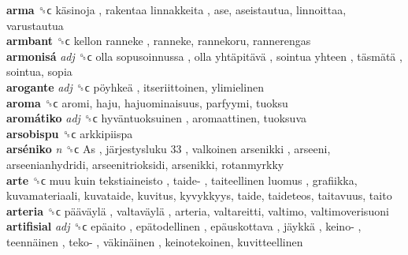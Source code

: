 \textbf{arma} ␝ϲ   käsinoja ,  rakentaa linnakkeita , ase, aseistautua, linnoittaa, varustautua  \\
\textbf{armbant} ␝ϲ   kellon ranneke , ranneke, rannekoru, rannerengas  \\
\textbf{armonisá} \emph{adj}  ␝ϲ   olla sopusoinnussa ,  olla yhtäpitävä ,  sointua yhteen ,  täsmätä , sointua, sopia  \\
\textbf{arogante} \emph{adj}  ␝ϲ   pöyhkeä , itseriittoinen, ylimielinen  \\
\textbf{aroma} ␝ϲ  aromi, haju, hajuominaisuus, parfyymi, tuoksu  \\
\textbf{aromátiko} \emph{adj}  ␝ϲ   hyväntuoksuinen , aromaattinen, tuoksuva  \\
\textbf{arsobispu} ␝ϲ  arkkipiispa  \\
\textbf{arséniko} \emph{n}  ␝ϲ   As ,  järjestysluku 33 ,  valkoinen arsenikki , arseeni, arseenianhydridi, arseenitrioksidi, arsenikki, rotanmyrkky  \\
\textbf{arte} ␝ϲ   muu kuin tekstiaineisto ,  taide- ,  taiteellinen luomus , grafiikka, kuvamateriaali, kuvataide, kuvitus, kyvykkyys, taide, taideteos, taitavuus, taito  \\
\textbf{arteria} ␝ϲ   pääväylä ,  valtaväylä , arteria, valtareitti, valtimo, valtimoverisuoni  \\
\textbf{artifisial} \emph{adj}  ␝ϲ   epäaito ,  epätodellinen ,  epäuskottava ,  jäykkä ,  keino- ,  teennäinen ,  teko- ,  väkinäinen , keinotekoinen, kuvitteellinen  \\
